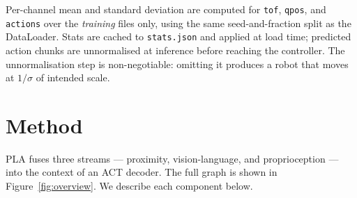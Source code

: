 \documentclass[11pt]{article}
\begin{document}
Per-channel mean and standard deviation are computed for \verb|tof|,
\verb|qpos|, and \verb|actions| over the \emph{training} files only,
using the same seed-and-fraction split as the DataLoader. Stats are
cached to \verb|stats.json| and applied at load time; predicted action
chunks are unnormalised at inference before reaching the controller. The
unnormalisation step is non-negotiable: omitting it produces a robot
that moves at $1/\sigma$ of intended scale.

\section{Method}
\label{sec:method}

PLA fuses three streams --- proximity, vision-language, and
proprioception --- into the context of an ACT decoder. The full graph is
shown in Figure~\ref{fig:overview}. We describe each component below.
\end{document}
